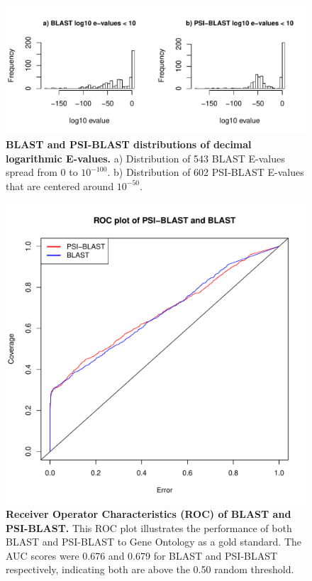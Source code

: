 \documentclass{article}
\begin{document}
\begin{figure}[!hb]
\centering
\includegraphics[width=\linewidth]{blast_evalue_cutoffs}
\caption{\textbf{BLAST and PSI-BLAST distributions of decimal logarithmic E-values.} a) Distribution of 543 BLAST E-values spread from $0$ to $10^{-100}$. b) Distribution of 602 PSI-BLAST E-values that are centered around $10^{-50}$.}
\label{fig:blast_evalue_cutoffs}
\end{figure}

\begin{figure}[!ht]
\includegraphics[width=0.9\linewidth]{roc_plot_blast}
\caption{\textbf{Receiver Operator Characteristics (ROC) of BLAST and PSI-BLAST.} This ROC plot illustrates the performance of both BLAST and PSI-BLAST to Gene Ontology as a gold standard. The AUC scores were 0.676 and 0.679 for BLAST and PSI-BLAST respectively, indicating both are above the 0.50 random threshold.}
\label{fig:roc_plot_blast}
\end{figure}
\end{document}
